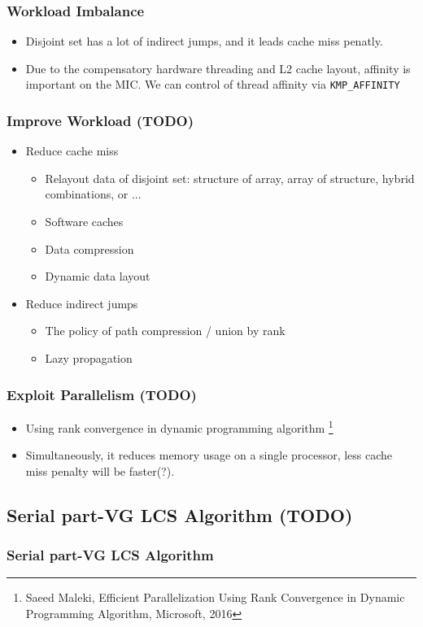 \begin{frame}
	\frametitle{Workload Imbalance}
	\begin{itemize}
		\setlength\itemsep{1em}
		\item Disjoint set has a lot of indirect jumps, and it leads cache miss penatly.
		\item Due to the compensatory hardware threading and L2 cache layout, affinity 
			is important on the MIC. We can control of thread affinity via \tt{KMP\_AFFINITY}
	\end{itemize}
\end{frame}

\begin{frame}
	\frametitle{Improve Workload (TODO)}
	\begin{itemize}
		\setlength\itemsep{1em}
		\item Reduce cache miss
			\begin{itemize}
			 	\item Relayout data of disjoint set: structure of array, 
			 		array of structure, hybrid combinations, or ...
			 	\item Software caches
			 	\item Data compression
			 	\item Dynamic data layout
			\end{itemize}
		\item Reduce indirect jumps
			\begin{itemize}
				\item The policy of path compression / union by rank
				\item Lazy propagation
			\end{itemize}
	\end{itemize}
\end{frame}

\begin{frame}
	\frametitle{Exploit Parallelism (TODO)}
	\begin{itemize}
		\setlength\itemsep{1em}
		\item Using rank convergence in dynamic programming algorithm
			\footnote{Saeed Maleki, Efficient Parallelization Using Rank Convergence in 
				Dynamic Programming Algorithm, Microsoft, 2016}
		\item Simultaneously, it reduces memory usage on a single processor,
			less cache miss penalty will be faster(?).
	\end{itemize}
\end{frame}

\subsection{Serial part-VG LCS Algorithm (TODO)}
\begin{frame}
	\frametitle{Serial part-VG LCS Algorithm}
\end{frame}

